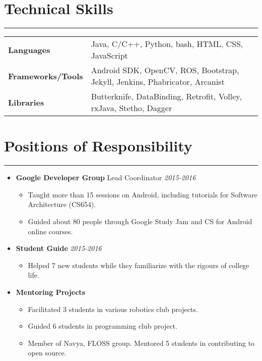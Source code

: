 \documentclass[a4paper]{article}
\begin{document}
\section*{Technical Skills}
\hrule
\vspace{3mm}
\begin{tabular}{@{}m{4.0cm}m{13cm}@{}}
	\textbf{\textrm{Languages}}        & Java, C/C++, Python, bash, HTML, CSS, JavaScript \\
	\textbf{\textrm{Frameworks/Tools}} & Android SDK, OpenCV, ROS, Bootstrap, Jekyll, Jenkins, Phabricator, Arcanist \\
	\textbf{\textrm{Libraries}}        & Butterknife, DataBinding, Retrofit, Volley, rxJava, Stetho, Dagger \\
\end{tabular}

\section*{Positions of Responsibility}
\hrule
\vspace{3mm}
\begin{itemize}
	\item
	      \textbf{Google Developer Group} Lead Coordinator
	      \hfill \textit{2015-2016}
	      \begin{itemize}
	      	\vspace{-2mm} \setlength\itemsep{-0.2em}
		\item Taught more than 15 sessions on Android, including tutorials for Software Architecture (CS654).
		\item Guided about 80 people through Google Study Jam and CS for Android online courses.
	      \end{itemize}
	\item
	      \textbf{Student Guide}
	      \hfill \textit{2015-2016}
	      \begin{itemize}
	      	\vspace{-2mm} \setlength\itemsep{-0.2em}
		\item Helped 7 new students while they familiarize with the rigours of college life.
	      \end{itemize}
	\item
	      \textbf{Mentoring Projects}
	      \begin{itemize}
	      	\vspace{-2mm} \setlength\itemsep{-0.2em}
	      	\item Facilitated 3 students in various robotics club projects.
	      	\item Guided 6 students in programming club project.
	      	\item Member of Navya, FLOSS group. Mentored 5 students in contributing to open source.
	      \end{itemize}
\end{itemize}
\end{document}
